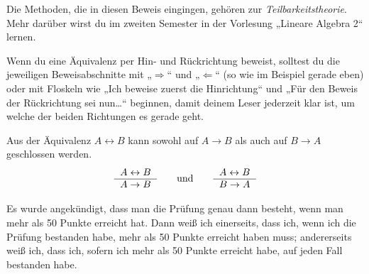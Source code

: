 \begin{bem}
    Die Methoden, die in diesen Beweis eingingen, gehören zur \emph{Teilbarkeitstheorie}. Mehr darüber wirst du im zweiten Semester in der Vorlesung „Lineare Algebra 2“ lernen.
\end{bem}


\begin{bem}
    Wenn du eine Äquivalenz per Hin- und Rückrichtung beweist, solltest du die jeweiligen Beweisabschnitte mit „$\Rightarrow$“ und „$\Leftarrow$“ (so wie im Beispiel gerade eben) oder mit Floskeln wie „Ich beweise zuerst die Hinrichtung“ und „Für den Beweis der Rückrichtung sei nun\dots“ beginnen, damit deinem Leser jederzeit klar ist, um welche der beiden Richtungen es gerade geht.
\end{bem}


\begin{axiom}
    Aus der Äquivalenz $A\leftrightarrow B$ kann sowohl auf $A\to B$ als auch auf $B\to A$ geschlossen werden.
    \[\begin{tabular}{r}
        $A\leftrightarrow B$ \\
        \hline 
        $A\to B$ 
    \end{tabular} \qquad\text{und}\qquad \begin{tabular}{r}
        $A\leftrightarrow B$ \\
        \hline 
        $B\to A$ 
    \end{tabular}\]
\end{axiom}


\begin{bsp}
    Es wurde angekündigt, dass man die Prüfung genau dann besteht, wenn man mehr als 50 Punkte erreicht hat. Dann weiß ich einerseits, dass ich, wenn ich die Prüfung bestanden habe, mehr als 50 Punkte erreicht haben muss; andererseits weiß ich, dass ich, sofern ich mehr als 50 Punkte erreicht habe, auf jeden Fall bestanden habe.
\end{bsp}


